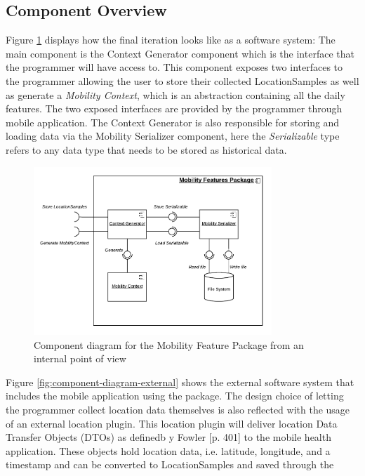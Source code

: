 \subsection{Component Overview}
Figure \ref{fig:component-diagram-internal} displays how the final iteration looks like as a software system: The main component is the Context Generator component which is the interface that the programmer will have access to. This component exposes two interfaces to the programmer allowing the user to store their collected LocationSamples as well as generate a \textit{Mobility Context}, which is an abstraction containing all the daily features. The two exposed interfaces are provided by the programmer through mobile application. The Context Generator is also responsible for storing and loading data via the Mobility Serializer component, here the \textit{Serializable} type refers to any data type that needs to be stored as historical data.

\begin{figure}[h]
\centering
\includegraphics[width=0.8\textwidth]{images/diagrams/component-internal.pdf}
\caption{Component diagram for the Mobility Feature Package from an internal point of view}
\label{fig:component-diagram-internal}
\end{figure}

Figure \ref{fig:component-diagram-external} shows the external software system that includes the mobile application using the package. The design choice of letting the programmer collect location data themselves is also reflected with the usage of an external location plugin. This location plugin will deliver location Data Transfer Objects (DTOs) as definedb y Fowler \cite{fowler-PEEA} [p. 401] to the mobile health application. These objects hold location data, i.e. latitude, longitude, and a timestamp and can be converted to LocationSamples and saved through the \textit{}


